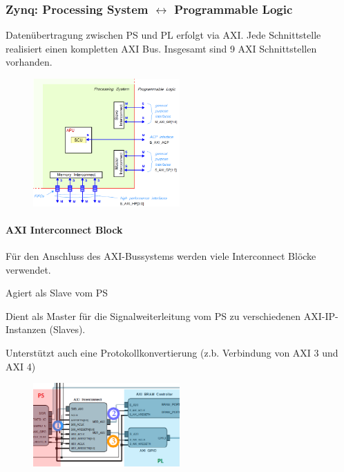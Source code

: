 \subsubsection{Zynq: Processing System $\leftrightarrow$ Programmable Logic}
\begin{multicols}{2}
    Datenübertragung zwischen PS und PL erfolgt via AXI. Jede Schnittstelle realisiert einen kompletten AXI Bus. Insgesamt sind 9 AXI Schnittstellen vorhanden.
    \begin{figure}[H]
     	\includegraphics[width=0.5\textwidth]{images/AXI_PL_PS.png}
     \end{figure} 
    \paragraph{AXI Interconnect Block}
    Für den Anschluss des AXI-Bussystems werden viele Interconnect Blöcke verwendet.
    \begin{compactitem}
        \item Agiert als Slave vom PS
        \item Dient als Master für die Signalweiterleitung vom PS zu verschiedenen AXI-IP-Instanzen (Slaves).
        \item Unterstützt auch eine Protokollkonvertierung (z.b. Verbindung von AXI 3 und AXI 4)
    \end{compactitem}
    \begin{figure}[H]
     	\includegraphics[width=0.5\textwidth]{images/AXI_Interconnect.png}
     \end{figure}
 \end{multicols}
 
